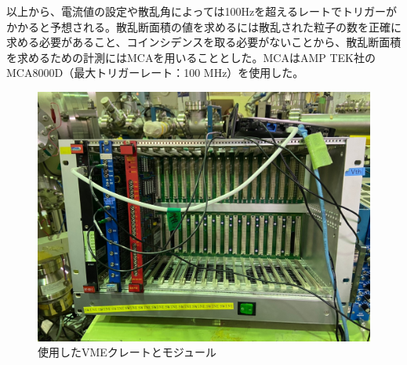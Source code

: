 \documentclass[a4paper,11pt,dvipdfmx]{jsarticle}
\begin{document}
\vspace*{5mm}

以上から、電流値の設定や散乱角によっては100Hzを超えるレートでトリガーがかかると予想される。散乱断面積の値を求めるには散乱された粒子の数を正確に求める必要があること、コインシデンスを取る必要がないことから、散乱断面積を求めるための計測にはMCAを用いることとした。MCAはAMP TEK社のMCA8000D（最大トリガーレート：100 MHz）を使用した。

\vspace*{15mm}

\begin{figure}[H]
\centering
\includegraphics[width=120mm]{picture/daq/vme.JPG}
\caption{使用したVMEクレートとモジュール}
\label{vme}
\end{figure}

\newpage
\end{document}
